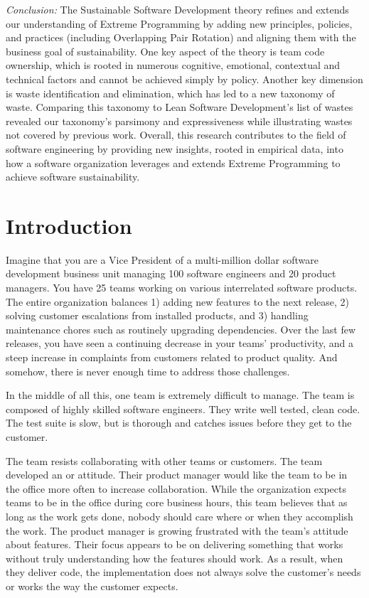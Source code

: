\textit{Conclusion:} The Sustainable Software Development theory refines and extends our understanding of Extreme Programming by adding new principles, policies, and practices (including Overlapping Pair Rotation) and aligning them with the business goal of sustainability. One key aspect of the theory is team code ownership, which is rooted in numerous cognitive, emotional, contextual and technical factors and cannot be achieved simply by policy. Another key dimension is waste identification and elimination, which has led to a new taxonomy of waste. Comparing this taxonomy to Lean Software Development’s list of wastes revealed our taxonomy’s parsimony and expressiveness while illustrating wastes not covered by previous work. Overall, this research contributes to the field of software engineering by providing new insights, rooted in empirical data, into how a software organization leverages and extends Extreme Programming to achieve software sustainability.














\chapter{Introduction}
\label{IntroductionChapter}


Imagine that you are a Vice President of a multi-million dollar software development business unit managing 100 software engineers and 20 product managers. You have 25 teams working on various interrelated software products. The entire organization balances 1) adding new features to the next release, 2) solving customer escalations from installed products, and 3) handling maintenance chores such as routinely upgrading dependencies. Over the last few releases, you have seen a continuing decrease in your teams’ productivity, and a steep increase in complaints from customers related to product quality. And somehow, there is never enough time to address those challenges.


In the middle of all this, one team is extremely difficult  to manage. The team is composed of highly skilled software engineers. They write well tested, clean code. The test suite is slow, but is thorough and catches issues before they get to the customer. 


The team resists collaborating with other teams or customers. The team developed an  or  attitude. Their product manager would like the team to be in the office more often to increase collaboration. While the organization expects teams to be in the office during core business hours, this team believes that as long as the work gets done, nobody should care where or when they accomplish the work. The product manager is growing frustrated with the team’s attitude about features. Their focus appears to be on delivering something that works without truly understanding how the features should work. As a result, when they deliver code, the implementation does not always solve the customer’s needs or works the way the customer expects. 


